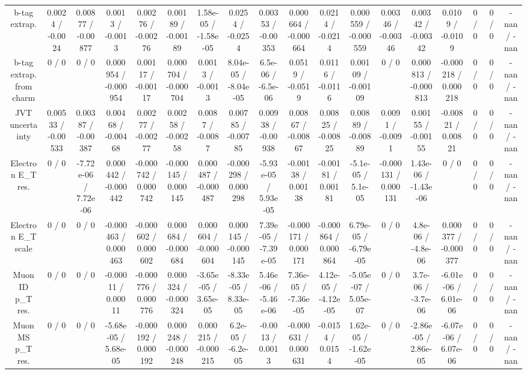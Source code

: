 \documentclass[10pt]{article}
\begin{document}
\begin{table}[htbp]
\begin{center}
\begin{tabular}{|c|c|c|c|c|c|c|c|c|c|c|c|c|c|c|c|c|c|}
  b-tag extrap. & 0.0024 / -0.0024 & 0.00877 / -0.00877 & 0.0013 / -0.0013 & 0.00276 / -0.00276 & 0.00189 / -0.00189 & 1.58e-05 / -1.58e-05 & 0.0254 / -0.0254 & 0.00353 / -0.00353 & 0.000664 / -0.000664 & 0.0214 / -0.0214 & 0.000559 / -0.000559 & 0.00346 / -0.00346 & 0.00342 / -0.00342 & 0.0109 / -0.0109 & 0 / 0 & 0 / 0 & -nan / -nan \\ 
  b-tag extrap. from charm & 0 / 0 & 0 / 0 & 0.000954 / -0.000954 & 0.00117 / -0.00117 & 0.000704 / -0.000704 & 0.0013 / -0.0013 & 8.04e-05 / -8.04e-05 & 6.5e-06 / -6.5e-06 & 0.0519 / -0.0519 & 0.0116 / -0.0116 & 0.00109 / -0.00109 & 0 / 0 & 0.000813 / -0.000813 & -0.000218 / 0.000218 & 0 / 0 & 0 / 0 & -nan / -nan \\ 
  JVT uncertainty & 0.00533 / -0.00533 & 0.00387 / -0.00387 & 0.00468 / -0.00468 & 0.00277 / -0.00277 & 0.00258 / -0.00258 & 0.0087 / -0.0087 & 0.00785 / -0.00785 & 0.00938 / -0.00938 & 0.00867 / -0.00867 & 0.00825 / -0.00825 & 0.00889 / -0.00889 & 0.0091 / -0.0091 & 0.00155 / -0.00155 & -0.00821 / 0.00821 & 0 / 0 & 0 / 0 & -nan / -nan \\ 
  Electron E_{T} res. & 0 / 0 & -7.72e-06 / 7.72e-06 & 0.000442 / -0.000442 & -0.000742 / 0.000742 & -0.000145 / 0.000145 & 0.000487 / -0.000487 & -0.000298 / 0.000298 & -5.93e-05 / 5.93e-05 & -0.00138 / 0.00138 & -0.00181 / 0.00181 & -5.1e-05 / 5.1e-05 & -0.000131 / 0.000131 & 1.43e-06 / -1.43e-06 & 0 / 0 & 0 / 0 & 0 / 0 & -nan / -nan \\ 
  Electron E_{T} scale & 0 / 0 & 0 / 0 & -0.000463 / 0.000463 & -0.000602 / 0.000602 & 0.000684 / -0.000684 & 0.000604 / -0.000604 & 0.000145 / -0.000145 & 7.39e-05 / -7.39e-05 & -0.000171 / 0.000171 & -0.000864 / 0.000864 & 6.79e-05 / -6.79e-05 & 0 / 0 & 4.8e-06 / -4.8e-06 & 0.000377 / -0.000377 & 0 / 0 & 0 / 0 & -nan / -nan \\ 
  Muon ID p_{T} res. & 0 / 0 & 0 / 0 & -0.00011 / 0.00011 & -0.000776 / 0.000776 & 0.000324 / -0.000324 & -3.65e-05 / 3.65e-05 & -8.33e-05 / 8.33e-05 & 5.46e-06 / -5.46e-06 & 7.36e-05 / -7.36e-05 & 4.12e-05 / -4.12e-05 & -5.05e-07 / 5.05e-07 & 0 / 0 & 3.7e-06 / -3.7e-06 & -6.01e-06 / 6.01e-06 & 0 / 0 & 0 / 0 & -nan / -nan \\ 
  Muon MS p_{T} res. & 0 / 0 & 0 / 0 & -5.68e-05 / 5.68e-05 & -0.000192 / 0.000192 & 0.000248 / -0.000248 & 0.000215 / -0.000215 & 6.2e-05 / -6.2e-05 & -0.0013 / 0.0013 & -0.000631 / 0.000631 & -0.0154 / 0.0154 & 1.62e-05 / -1.62e-05 & 0 / 0 & -2.86e-05 / 2.86e-05 & -6.07e-06 / 6.07e-06 & 0 / 0 & 0 / 0 & -nan / -nan \\ 

\end{tabular}
\end{center}
\end{table}
\end{document}
